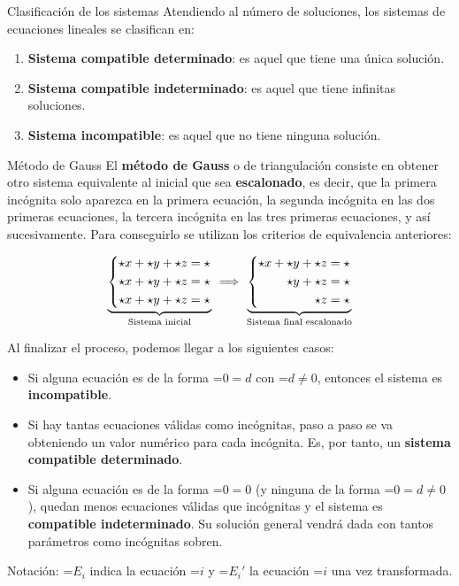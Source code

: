 \documentclass[11pt,a4paper]{article}
\newcommand{\fmm}[1]{\setbox0=\hbox{$#1$}\ifdim\wd0>\linewidth\fmdisp{#1}\else\mbox{\box0}\fi}
\newcommand{\fmdisp}[1]{\[\setbox2=\hbox{$\displaystyle #1$}\ifdim\wd2>\linewidth\resizebox{\linewidth}{!}{\box2}\else\box2\fi\]}
\newcommand{\fmbadge}[2]{\tcbox[on line,colback=#1,colframe=#1,arc=2mm,boxsep=0pt,left=4pt,right=4pt,top=1.5pt,bottom=1.5pt]{\color{white}\footnotesize\bfseries #2}}
\begin{document}
\begin{fmprop}{Clasificación de los sistemas}
Atendiendo al número de soluciones, los sistemas de ecuaciones lineales se clasifican en:

\begin{enumerate}
\item \fmbadge{fmok}{SCD} \textbf{Sistema compatible determinado}: es aquel que tiene una única solución.
\item \fmbadge{fmev}{SCI} \textbf{Sistema compatible indeterminado}: es aquel que tiene infinitas soluciones.
\item \fmbadge{fmsi}{SI} \textbf{Sistema incompatible}: es aquel que no tiene ninguna solución.
\end{enumerate}
\end{fmprop}

\begin{fmdef}{Método de Gauss}
El \textbf{método de Gauss} o de triangulación consiste en obtener otro sistema equivalente al inicial que sea \textbf{escalonado}, es decir, que la primera incógnita solo aparezca en la primera ecuación, la segunda incógnita en las dos primeras ecuaciones, la tercera incógnita en las tres primeras ecuaciones, y así sucesivamente. Para conseguirlo se utilizan los criterios de equivalencia anteriores:

\fmdisp{\underbrace{\left\{\begin{aligned}\star x+\star y+\star z&=\star\\ \star x+\star y+\star z&=\star\\ \star x+\star y+\star z&=\star\end{aligned}\right.}_{\text{Sistema inicial}}\ \Longrightarrow\ \underbrace{\left\{\begin{aligned}\star x+\star y+\star z&=\star\\ \star y+\star z&=\star\\ \star z&=\star\end{aligned}\right.}_{\text{Sistema final escalonado}}}

Al finalizar el proceso, podemos llegar a los siguientes casos:

\begin{itemize}
\item Si alguna ecuación es de la forma \fmm{0=d} con \fmm{d\neq0}, entonces el sistema es \textbf{incompatible}.
\item Si hay tantas ecuaciones válidas como incógnitas, paso a paso se va obteniendo un valor numérico para cada incógnita. Es, por tanto, un \textbf{sistema compatible determinado}.
\item Si alguna ecuación es de la forma \fmm{0=0} (y ninguna de la forma \fmm{0=d\neq0}), quedan menos ecuaciones válidas que incógnitas y el sistema es \textbf{compatible indeterminado}. Su solución general vendrá dada con tantos parámetros como incógnitas sobren.
\end{itemize}

\begin{fmnote}Notación: \fmm{E_i} indica la ecuación \fmm{i} y \fmm{E_i'} la ecuación \fmm{i} una vez transformada.\end{fmnote}
\end{fmdef}
\end{document}
